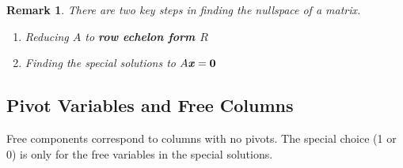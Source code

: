\documentclass[12pt, letterpaper]{article}
\newcommand{\V}[1]{\textbf{\textit{#1}}}
\newcommand{\DefinitionSpace}{\vspace{15px}}
\newtheorem*{remark}{Remark}
\theoremstyle{definition}
\begin{document}
\DefinitionSpace
	\begin{remark}
		There are two key steps in finding the nullspace of a matrix. 
		\begin{enumerate}
			\item Reducing $A$ to \textbf{row echelon form $R$}
			\item Finding the special solutions to $A\V{x}=\textbf{0}$
		\end{enumerate}
	\end{remark}
\DefinitionSpace

\subsection{Pivot Variables and Free Columns}
	Free components correspond to columns with no pivots. The special choice (1 or 0) is only for the free variables in the special solutions.
	
\end{document}
